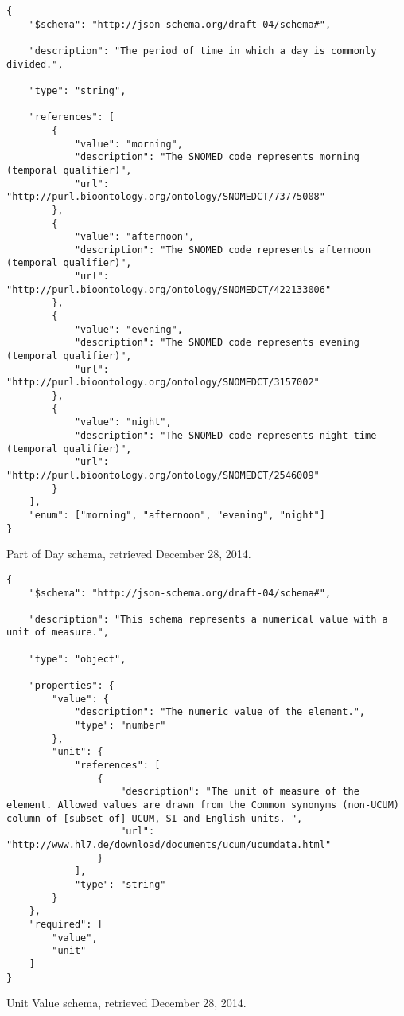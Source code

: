 

\begin{listing}
\begin{verbatim}
{
    "$schema": "http://json-schema.org/draft-04/schema#",

    "description": "The period of time in which a day is commonly divided.",

    "type": "string",

    "references": [
        {
            "value": "morning",
            "description": "The SNOMED code represents morning (temporal qualifier)",
            "url": "http://purl.bioontology.org/ontology/SNOMEDCT/73775008"
        },
        {
            "value": "afternoon",
            "description": "The SNOMED code represents afternoon (temporal qualifier)",
            "url": "http://purl.bioontology.org/ontology/SNOMEDCT/422133006"
        },
        {
            "value": "evening",
            "description": "The SNOMED code represents evening (temporal qualifier)",
            "url": "http://purl.bioontology.org/ontology/SNOMEDCT/3157002"
        },
        {
            "value": "night",
            "description": "The SNOMED code represents night time (temporal qualifier)",
            "url": "http://purl.bioontology.org/ontology/SNOMEDCT/2546009"
        }
    ],
    "enum": ["morning", "afternoon", "evening", "night"]
}
\end{verbatim}
\caption{Part of Day schema, retrieved December 28, 2014.} 
\label{listing:part-of-day-json}
\end{listing}


\begin{listing}
\begin{verbatim}
{
    "$schema": "http://json-schema.org/draft-04/schema#",

    "description": "This schema represents a numerical value with a unit of measure.",

    "type": "object",

    "properties": {
        "value": {
            "description": "The numeric value of the element.",
            "type": "number"
        },
        "unit": {
            "references": [
                {
                    "description": "The unit of measure of the element. Allowed values are drawn from the Common synonyms (non-UCUM) column of [subset of] UCUM, SI and English units. ",
                    "url": "http://www.hl7.de/download/documents/ucum/ucumdata.html"
                }
            ],
            "type": "string"
        }
    },
    "required": [
        "value",
        "unit"
    ]
}
\end{verbatim}
\caption{Unit Value schema, retrieved December 28, 2014.} 
\label{listing:unit-value-json}
\end{listing}
        